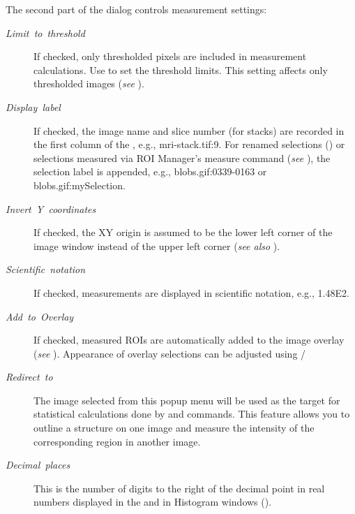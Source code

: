 The second part of the dialog controls measurement settings:
\begin{description}
\item [{\emph{Limit\ to\ threshold}}] If checked, only thresholded pixels
are included in measurement calculations. Use 
to set the threshold limits. This setting affects only thresholded
images (\emph{see} ).
\item [{\emph{Display\ label}}] If checked, the image name and slice number
(for stacks) are recorded in the first column of the ,
e.g., mri-stack.tif:9. For renamed selections ()
or selections measured via ROI Manager's measure command (\emph{see}
), the selection label
is appended, e.g., blobs.gif:0339-0163 or blobs.gif:mySelection.
\item [{\emph{\label{misc:InvertYcoordinates}Invert\ Y\ coordinates}}] If
checked, the XY origin is assumed to be the lower left corner of the
image window instead of the upper left corner (\emph{see also} ).
\item [{\emph{Scientific\ notation}}] \improvement{}If checked, measurements
are displayed in scientific notation, e.g., 1.48E2.
\item [{\emph{Add\ to\ Overlay}}] If checked, measured ROIs are automatically
added to the image overlay (\emph{see} ).
Appearance of overlay selections can be adjusted using /
\item [{\emph{Redirect\ to}}] The image selected from this popup menu
will be used as the target for statistical calculations done by 
and 
commands. This feature allows you to outline a structure on one image
and measure the intensity of the corresponding region in another image.
\item [{\emph{Decimal\ places}}] \improvement{}This is the number of
digits to the right of the decimal point in real numbers displayed
in the  and in Histogram windows ().
\end{description}


